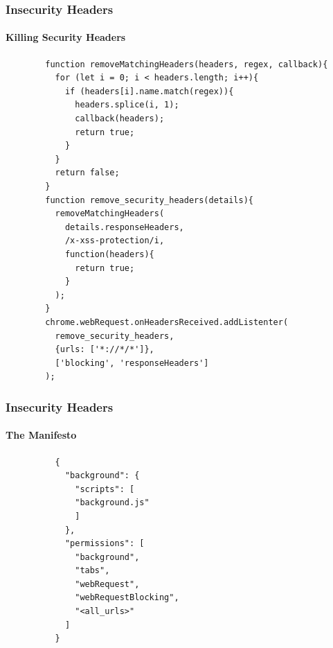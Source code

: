 \documentclass[aspectratio=169]{beamer}
\begin{document}
\begin{frame}[fragile]{}
  \frametitle{Insecurity Headers}
  \framesubtitle{Killing Security Headers}
  \begin{center}
    \begin{tcolorbox}[title=headers.js,colback=black]
    \begin{minipage}{0.5\textwidth}
      \begin{verbatim}
        function removeMatchingHeaders(headers, regex, callback){
          for (let i = 0; i < headers.length; i++){
            if (headers[i].name.match(regex)){
              headers.splice(i, 1);
              callback(headers);
              return true;
            }
          }
          return false;
        }
        function remove_security_headers(details){
          removeMatchingHeaders(
            details.responseHeaders,
            /x-xss-protection/i,
            function(headers){
              return true;
            }
          );
        }
        chrome.webRequest.onHeadersReceived.addListenter(
          remove_security_headers,
          {urls: ['*://*/*']},
          ['blocking', 'responseHeaders']
        );
      \end{verbatim}
    \end{minipage}
    \end{tcolorbox}
  \end{center}
\end{frame}
\begin{frame}[fragile]{}
  \frametitle{Insecurity Headers}
  \framesubtitle{The Manifesto}
  \begin{center}
    \begin{minipage}{0.5\textwidth}
      \begin{tcolorbox}[title=manifest.json,colback=black]
        \begin{verbatim}
          {
            "background": {
              "scripts": [
              "background.js"
              ]
            },
            "permissions": [
              "background",
              "tabs",
              "webRequest",
              "webRequestBlocking",
              "<all_urls>"
            ]
          }
        \end{verbatim}
      \end{tcolorbox}
    \end{minipage}
  \end{center}
\end{frame}
\end{document}
